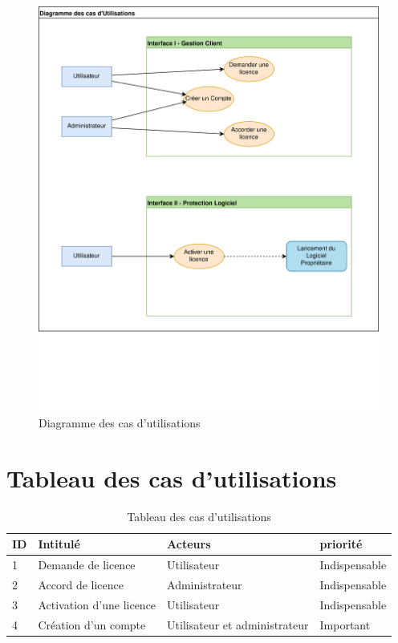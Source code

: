 \begin{figure}[h]
	\centering
	\includegraphics[width=13.5cm]{main/Util.png}
	\vspace{-3.2cm}
	\caption{Diagramme des cas d'utilisations}
	\label{fig:fig2}
\end{figure}

\section{Tableau des cas d'utilisations}

\begin{table}[h]
	\centering
	\begin{tabular}{ | m{0.6cm} | m{6cm} | m{6cm}| m{3cm} | } 
                \hline
		\textbf{ID} & \textbf{Intitulé} & \textbf{Acteurs} & \textbf{priorité} \\
                \hline
			1 & Demande de licence & Utilisateur & Indispensable \\
                \hline
			2 & Accord de licence & Administrateur & Indispensable \\
                \hline
			3 & Activation d'une licence & Utilisateur & Indispensable \\
		\hline
			4 & Création d'un compte & Utilisateur et administrateur & Important \\
		\hline
        \end{tabular}
	\caption{Tableau des cas d'utilisations}
	\label{tab:tab1}
\end{table}
\newpage

